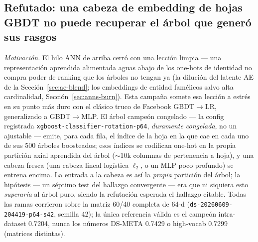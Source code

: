 \documentclass[11pt]{article}
\newcommand{\dsid}[1]{\texttt{\small #1}}
\begin{document}
\subsection{Refutado: una cabeza de embedding de hojas GBDT no puede recuperar el árbol que generó sus rasgos}
\label{sec:leaf-head}
\emph{Motivación.} El hilo ANN de arriba cerró con una lección limpia --- una
representación aprendida alimentada aguas abajo de los one-hots de identidad no
compra poder de ranking que los árboles no tengan ya (la dilución del latente AE
de la Sección~\ref{sec:ae-blend}; los embeddings de entidad famélicos salvo alta
cardinalidad, Sección~\ref{sec:anns-burn}). Esta campaña somete esa lección a
estrés en su punto más duro con el clásico truco de Facebook GBDT$\to$LR,
generalizado a GBDT$\to$MLP. El árbol campeón congelado --- la config registrada
\texttt{xgboost-classifier-rotation-p64}, \emph{duramente congelada}, no un
ajustable --- emite, para cada fila, el índice de la hoja en la que cae en cada
uno de sus 500 árboles boosteados; esos índices se codifican one-hot en la propia
partición axial aprendida del árbol ($\sim$10k columnas de pertenencia a hoja), y
una cabeza fresca (una cabeza lineal logística $\ell_2$, o un MLP poco profundo)
se entrena encima. La entrada a la cabeza es así la \emph{propia} partición del
árbol; la hipótesis --- un séptimo test del hallazgo convergente --- era que ni
siquiera esto \emph{superaría} al árbol puro, siendo la refutación esperada el
hallazgo citable. Todas las ramas corrieron sobre la matriz 60/40 completa de 64-d
(\dsid{ds-20260609-204419-p64-s42}, semilla 42); la única referencia válida es el
campeón intra-dataset \num{0.7204}, nunca los números DS-META \num{0.7429} o
high-vocab \num{0.7299} (matrices distintas).
\end{document}
